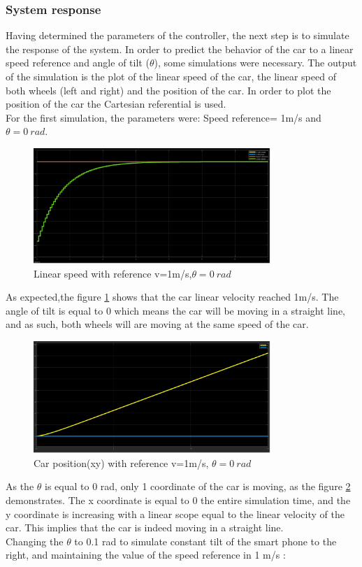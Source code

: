 \subsubsection{System response}
\label{sec:des-sim-res}
Having determined the parameters of the controller, the next step is to simulate the response of the system.
In order to predict the behavior of the car to a linear speed reference and angle of tilt ($\theta$), some simulations were necessary. The output of the simulation is the plot of the linear speed of the car, the linear speed of both wheels (left and right) and the position of the car.
In order to plot the position of the car the Cartesian referential is used.\\
For the first simulation, the parameters were: Speed reference= 1m/s and $\theta = 0~\si{rad}$.\\
\begin{figure}[!h]
\centering
\includegraphics[width=0.8\textwidth]{./img/vel10.png}
\caption {\label{fig:sim1 - vel}Linear speed with reference v=1m/s,$\theta = 0~\si{rad}$}
\end{figure}
 As expected,the figure \ref{fig:sim1 - vel} shows that the car linear velocity reached 1m/s. The angle of tilt is equal to 0 which means the car will be moving in a straight line, and as such, both wheels will are moving at the same speed of the car.\\
\newpage
\begin{figure}[!h]
\centering
\includegraphics[width=0.8\textwidth]{./img/xy10.png}
\caption {\label{fig:sim1 - pos}Car position(xy) with reference v=1m/s, $\theta = 0~\si{rad}$}
\end{figure}
As the $\theta$ is equal to 0 rad, only 1 coordinate of the car is moving, as the figure \ref{fig:sim1 - pos} demonstrates. The x coordinate is equal to 0 the entire simulation time, and the y coordinate is increasing with a linear scope equal to the linear velocity of the car. This implies that the car is indeed moving in a straight line.\\
Changing the $\theta$ to 0.1 rad to simulate constant tilt of the smart phone to the right, and maintaining the value of the speed reference in 1 m/s :\


